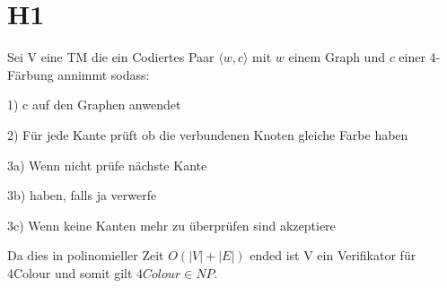 \section*{H1}

Sei V eine TM die ein Codiertes Paar $ \langle w , c \rangle $ mit $w$ einem Graph und $c$ einer 4-Färbung annimmt sodass:

	1) c auf den Graphen anwendet
	
	2) Für jede Kante prüft ob die verbundenen Knoten gleiche Farbe haben

	3a) Wenn nicht prüfe nächste Kante	

	3b)	haben, falls ja verwerfe

    3c) Wenn keine Kanten mehr zu überprüfen sind akzeptiere 

Da dies in polinomieller Zeit $O(|V|+|E|)$ ended ist V ein Verifikator für 4Colour	 und somit gilt $4Colour \in NP$.
